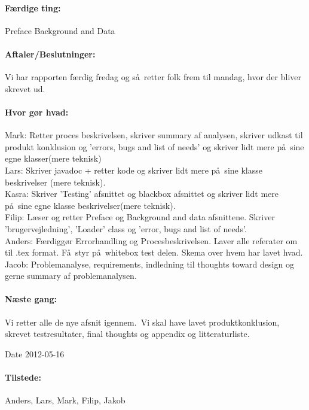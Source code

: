 \documentclass[a4paper,10pt,titlepage]{article}
\begin{document}
		\paragraph{F\ae rdige ting:}
		Preface
Background and Data

		\paragraph{Aftaler/Beslutninger:}
		Vi har rapporten f\ae rdig fredag og s\aa \ retter folk frem til mandag, hvor der bliver skrevet ud. 
		\paragraph{Hvor g\o r hvad:}
		Mark: Retter proces beskrivelsen, skriver summary af analysen, skriver udkast til produkt konklusion og ’errors, bugs and list of needs’ og skriver lidt mere p\aa \ sine egne klasser(mere teknisk)\\
Lars: Skriver javadoc + retter kode og skriver lidt mere p\aa \ sine klasse beskrivelser (mere teknisk).\\
Kasra: Skriver ’Testing’ afsnittet og blackbox afsnittet og skriver lidt mere p\aa \ sine egne klasse beskrivelser(mere teknisk).\\
Filip: L\ae ser og retter Preface og Background and data afsnittene. Skriver ’brugervejledning’, ’Loader’ class og ’error, bugs and list of needs’.\\
Anders: F\ae rdigg\o r Errorhandling og Procesbeskrivelsen. Laver alle referater om til .tex format. F\aa \ styr p\aa \ whitebox test delen.  Skema over hvem har lavet hvad.\\
Jacob: Problemanalyse, requirements, indledning til thoughts toward design og gerne summary af problemanalysen. 

		\paragraph{N\ae ste gang:} 
		Vi retter alle de nye afsnit igennem.\
Vi skal have lavet produktkonklusion, skrevet testresultater, final thoughts og appendix og litteraturliste. 

\begin{center}
		Date 2012-05-16
		\end{center}
		
		\paragraph{Tilstede:} Anders, Lars, Mark, Filip, Jakob
		
\end{document}
